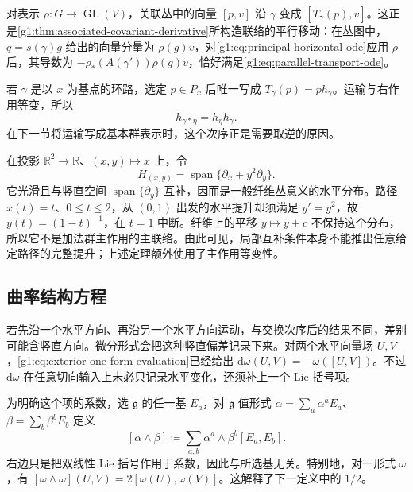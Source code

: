 对表示 \(\rho:G\to\operatorname{GL}(V)\)，关联丛中的向量 \([p,v]\) 沿 \(\gamma\) 变成 \([T_\gamma(p),v]\)。这正是\cref{g1:thm:associated-covariant-derivative}所构造联络的平行移动：在丛图中，\(q=s(\gamma)g\) 给出的向量分量为 \(\rho(g)v\)，对\eqref{g1:eq:principal-horizontal-ode}应用 \(\rho\) 后，其导数为 \(-\rho_*(A(\gamma'))\rho(g)v\)，恰好满足\eqref{g1:eq:parallel-transport-ode}。

\ProseParagraphBreak

若 \(\gamma\) 是以 \(x\) 为基点的环路，选定 \(p\in P_x\) 后唯一写成 \(T_\gamma(p)=p h_\gamma\)。运输与右作用等变，所以
\begin{equation}\label{g1:eq:principal-loop-composition}
	h_{\gamma*\eta}=h_\eta h_\gamma.
\end{equation}
在下一节将运输写成基本群表示时，这个次序正是需要取逆的原因。

\begin{example}\label{g1:exm:incomplete-ehresmann-lift}
	在投影 \(\mathbb R^2\to\mathbb R\)、\((x,y)\mapsto x\) 上，令
	\[
		H_{(x,y)}=\operatorname{span}\{\partial_x+y^2\partial_y\}.
	\]
	它光滑且与竖直空间 \(\operatorname{span}\{\partial_y\}\) 互补，因而是一般纤维丛意义的水平分布。路径 \(x(t)=t\)、\(0\le t\le2\)，从 \((0,1)\) 出发的水平提升却须满足 \(y'=y^2\)，故 \(y(t)=(1-t)^{-1}\)，在 \(t=1\) 中断。纤维上的平移 \(y\mapsto y+c\) 不保持这个分布，所以它不是加法群主作用的主联络。由此可见，局部互补条件本身不能推出任意给定路径的完整提升；上述定理额外使用了主作用等变性。
\end{example}

\subsection{曲率结构方程}
\label{g1:subsec:1803:02}

若先沿一个水平方向、再沿另一个水平方向运动，与交换次序后的结果不同，差别可能含竖直方向。微分形式会把这种竖直偏差记录下来。对两个水平向量场 \(U,V\)，\eqref{g1:eq:exterior-one-form-evaluation}已经给出 \(\mathrm{d}\omega(U,V)=-\omega([U,V])\)。不过 \(\mathrm{d}\omega\) 在任意切向输入上未必只记录水平变化，还须补上一个 Lie 括号项。

\ProseParagraphBreak

为明确这个项的系数，选 \(\mathfrak g\) 的任一基 \(E_a\)，对 \(\mathfrak g\) 值形式 \(\alpha=\sum_a\alpha^aE_a\)、\(\beta=\sum_b\beta^bE_b\) 定义
\begin{equation}\label{g1:eq:lie-bracket-wedge}
	[\alpha\wedge\beta]\coloneqq\sum_{a,b}\alpha^a\wedge\beta^b[E_a,E_b].
\end{equation}
右边只是把双线性 Lie 括号作用于系数，因此与所选基无关。特别地，对一形式 \(\omega\)，有 \([\omega\wedge\omega](U,V)=2[\omega(U),\omega(V)]\)。这解释了下一定义中的 \(1/2\)。

